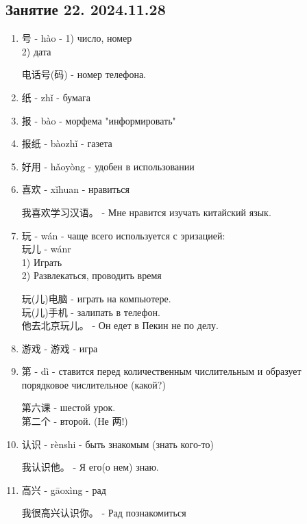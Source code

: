 \LARGE
\newpage
\subsection{Занятие 22. 2024.11.28}
\begin{newwords}\hfill
	\begin{enumerate}
	\item 号 - hào - 1) число, номер\\
	2) дата
	\begin{example}\hfill\break
		电话号(码) - номер телефона.
	\end{example}
	\item 纸 - zhǐ - бумага
	\item 报 - bào - морфема "информировать"
	\item 报纸 - bàozhǐ - газета
	\item 好用 - hǎoyòng - удобен в использовании
	\item 喜欢 - xǐhuan - нравиться
	\begin{example}\hfill\break
		我喜欢学习汉语。 - Мне нравится изучать китайский язык.
	\end{example}
	\item 玩 - wán - чаще всего используется с эризацией:\\
	玩儿 - wánr\\
	1) Играть\\
	2) Развлекаться, проводить время
	\begin{example}\hfill\break
		玩(儿)电脑 - играть на компьютере.\\
		玩(儿)手机 - залипать в телефон.\\
		他去北京玩儿。 - Он едет в Пекин не по делу.
	\end{example}
	\item 游戏 - 游戏 - игра
	\item 第 - dì - ставится перед количественным числительным и образует порядковое числительное (какой?)
	\begin{example}\hfill\break
		第六课 - шестой урок.\\
		第二个 - второй. (Не 两!)
	\end{example}
	\item 认识 - rènshi - быть знакомым (знать кого-то)
	\begin{example}\hfill\break
		我认识他。 - Я его(о нем) знаю.
	\end{example}
	\item 高兴 - gāoxìng - рад
	\begin{example}\hfill\break
		我很高兴认识你。 - Рад познакомиться

\end{example}
\end{enumerate}
\end{newwords}
